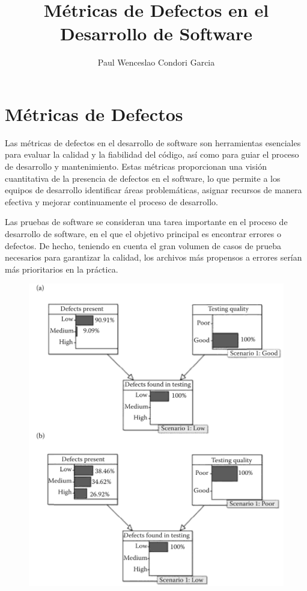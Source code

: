 \documentclass{article}
\title{Métricas de Defectos en el Desarrollo de Software}
\author{Paul Wenceslao Condori Garcia}
\begin{document}
\maketitle

\section{Métricas de Defectos}

Las métricas de defectos en el desarrollo de software son herramientas esenciales para evaluar la calidad y la fiabilidad del código, así como para guiar el proceso de desarrollo y mantenimiento. Estas métricas proporcionan una visión cuantitativa de la presencia de defectos en el software, lo que permite a los equipos de desarrollo identificar áreas problemáticas, asignar recursos de manera efectiva y mejorar continuamente el proceso de desarrollo.

Las pruebas de software se consideran una tarea importante en el proceso de desarrollo de software, en el que el objetivo principal es encontrar errores o defectos. De hecho, teniendo en cuenta el gran volumen de casos de prueba necesarios para garantizar la calidad, los archivos más propensos a errores serían más prioritarios en la práctica.

\begin{figure}
  \centering
  \includegraphics{md1.png}
  \label{fig:imagen}
\end{figure}
\end{document}
